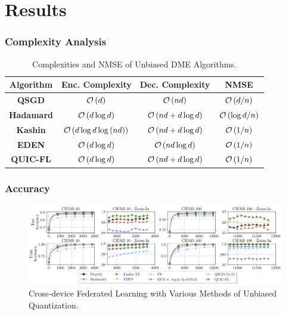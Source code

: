\documentclass{beamer}
\begin{document}
    \section{Results}
    \begin{frame}
        \frametitle{Complexity Analysis}
        \begin{table}
            \centering
            \begin{tabular}{|c|c|c|c|}
                \hline
                \textbf{Algorithm} & \textbf{Enc. Complexity} & \textbf{Dec. Complexity} & \textbf{NMSE} \\
                \hline 
                \textbf{QSGD} & \(\mathcal O\left(d\right)\) & \(\mathcal O\left(nd\right)\) & \(\mathcal O\left(d/n\right)\) \\
                \hline
                \textbf{Hadamard} & \(\mathcal O\left(d\log d\right)\) & \(\mathcal O\left(nd + d\log d\right)\) & \(\mathcal O\left(\log d/n\right)\) \\
                \hline
                \textbf{Kashin} & \(\mathcal O\left(d\log d\log\left(nd\right)\right)\) & \(\mathcal O\left(nd + d\log d\right)\) & \(\mathcal O\left(1/n\right)\) \\
                \hline
                \textbf{EDEN} & \(\mathcal O\left(d\log d\right)\) & \(\mathcal O\left(nd\log d\right)\) & \(\mathcal O\left(1/n\right)\) \\
                \hline
                \textbf{QUIC-FL} & \(\mathcal O\left(d\log d\right)\) & \(\mathcal O\left(nd + d\log d\right)\) & \(\mathcal O\left(1/n\right)\) \\
                \hline
            \end{tabular}
            \caption{Complexities and NMSE of Unbiased DME Algorithms.}
            \label{fig:quic-fl-comp}
        \end{table}
    \end{frame}

    \begin{frame}
        \frametitle{Accuracy}    
        \begin{figure}
            \centering
            \includegraphics[width=\columnwidth]{images/results.png}
            \caption{Cross-device Federated Learning with Various Methods of
            Unbiased Quantization. \cite{basat2023quicfl}}
            \label{fig:quic-fl-acc}
        \end{figure}
    \end{frame}
\end{document}
